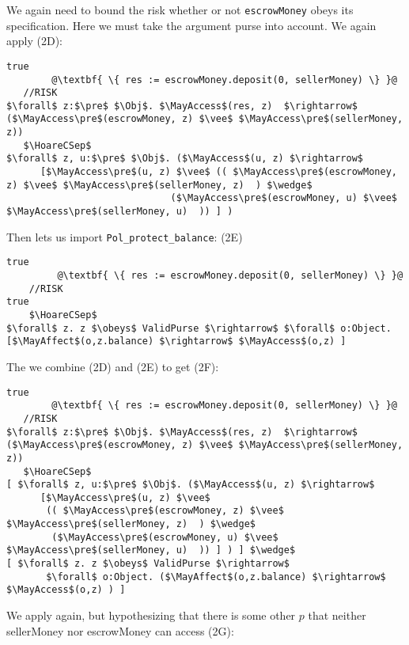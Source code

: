 We again need to bound the risk whether or not \lstinline+escrowMoney+
obeys its specification. Here we must take the argument purse into account.
We again apply  (2D):

\begin{lstlisting}[escapechar=@]
true
        @\textbf{ \{ res := escrowMoney.deposit(0, sellerMoney) \} }@
   //RISK
$\forall$ z:$\pre$ $\Obj$. $\MayAccess$(res, z)  $\rightarrow$ ($\MayAccess\pre$(escrowMoney, z) $\vee$ $\MayAccess\pre$(sellerMoney, z))
   $\HoareCSep$
$\forall$ z, u:$\pre$ $\Obj$. ($\MayAccess$(u, z) $\rightarrow$
      [$\MayAccess\pre$(u, z) $\vee$ (( $\MayAccess\pre$(escrowMoney, z) $\vee$ $\MayAccess\pre$(sellerMoney, z)  ) $\wedge$
                             ($\MayAccess\pre$(escrowMoney, u) $\vee$ $\MayAccess\pre$(sellerMoney, u)  )) ] )
\end{lstlisting}


Then  lets us import \lstinline+Pol_protect_balance+: (2E)

\begin{lstlisting}[escapechar=@]
true
         @\textbf{ \{ res := escrowMoney.deposit(0, sellerMoney) \} }@
    //RISK
true
    $\HoareCSep$
$\forall$ z. z $\obeys$ ValidPurse $\rightarrow$ $\forall$ o:Object. [$\MayAffect$(o,z.balance) $\rightarrow$ $\MayAccess$(o,z) ]
\end{lstlisting}


The we combine (2D) and (2E) to get (2F):

\begin{lstlisting}[escapechar=@]
true
        @\textbf{ \{ res := escrowMoney.deposit(0, sellerMoney) \} }@
   //RISK
$\forall$ z:$\pre$ $\Obj$. $\MayAccess$(res, z)  $\rightarrow$ ($\MayAccess\pre$(escrowMoney, z) $\vee$ $\MayAccess\pre$(sellerMoney, z))
   $\HoareCSep$
[ $\forall$ z, u:$\pre$ $\Obj$. ($\MayAccess$(u, z) $\rightarrow$
      [$\MayAccess\pre$(u, z) $\vee$
       (( $\MayAccess\pre$(escrowMoney, z) $\vee$ $\MayAccess\pre$(sellerMoney, z)  ) $\wedge$
        ($\MayAccess\pre$(escrowMoney, u) $\vee$ $\MayAccess\pre$(sellerMoney, u)  )) ] ) ] $\wedge$
[ $\forall$ z. z $\obeys$ ValidPurse $\rightarrow$
       $\forall$ o:Object. ($\MayAffect$(o,z.balance) $\rightarrow$ $\MayAccess$(o,z) ) ]
\end{lstlisting}


  We apply 
again, but hypothesizing that there is some other   $p$ that
neither sellerMoney nor escrowMoney can access (2G):


